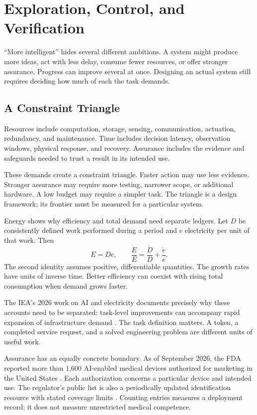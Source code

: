 \section{Exploration, Control, and Verification}

“More intelligent” hides several different ambitions. A system might produce more ideas, act with less delay, consume fewer resources, or offer stronger assurance. Progress can improve several at once. Designing an actual system still requires deciding how much of each the task demands.

\subsection{A Constraint Triangle}

Resources include computation, storage, sensing, communication, actuation, redundancy, and maintenance. Time includes decision latency, observation windows, physical response, and recovery. Assurance includes the evidence and safeguards needed to trust a result in its intended use.

These demands create a constraint triangle. Faster action may use less evidence. Stronger assurance may require more testing, narrower scope, or additional hardware. A low budget may require a simpler task. The triangle is a design framework; its frontier must be measured for a particular system.

Energy shows why efficiency and total demand need separate ledgers. Let $D$ be consistently defined work performed during a period and $e$ electricity per unit of that work. Then
\begin{equation}
 E=De,\qquad
 \frac{\dot E}{E}=\frac{\dot D}{D}+\frac{\dot e}{e}.
\end{equation}
The second identity assumes positive, differentiable quantities. The growth rates have units of inverse time. Better efficiency can coexist with rising total consumption when demand grows faster.

The IEA's 2026 work on AI and electricity documents precisely why these accounts need to be separated: task-level improvements can accompany rapid expansion of infrastructure demand \cite{iea2026questions,iea2026powering}. The task definition matters. A token, a completed service request, and a solved engineering problem are different units of useful work.

Assurance has an equally concrete boundary. As of September 2026, the FDA reported more than 1,600 AI-enabled medical devices authorized for marketing in the United States \cite{fda2026aidevices}. Each authorization concerns a particular device and intended use. The regulator's public list is also a periodically updated identification resource with stated coverage limits \cite{fda2026ailist}. Counting entries measures a deployment record; it does not measure unrestricted medical competence.

